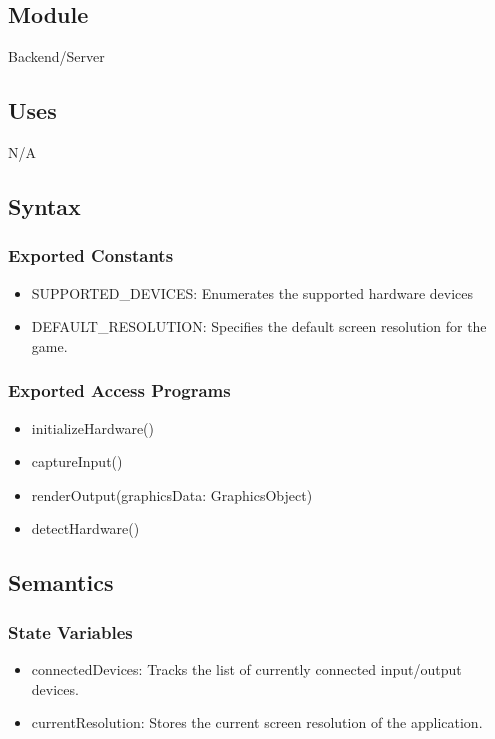 \documentclass[12pt, titlepage]{article}
\begin{document}
\subsection{Module}
\hspace{1.5em}Backend/Server

\subsection{Uses}
\hspace{1.5em}N/A

\subsection{Syntax}

\subsubsection{Exported Constants}
\begin{itemize}
\item SUPPORTED\_DEVICES: Enumerates the supported hardware devices

\item DEFAULT\_RESOLUTION: Specifies the default screen resolution for the game.
\end{itemize}

\subsubsection{Exported Access Programs}

\begin{itemize}
\item initializeHardware()
\item captureInput()
\item renderOutput(graphicsData: GraphicsObject)
\item detectHardware()
\end{itemize}

\subsection{Semantics}

\subsubsection{State Variables}
\begin{itemize}
\item connectedDevices: Tracks the list of currently connected input/output devices.
\item currentResolution: Stores the current screen resolution of the application.
\end{itemize}
\end{document}
